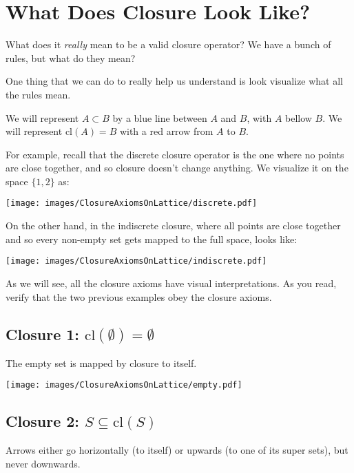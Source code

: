 \documentclass{report}
\newcommand{\cl}{\mathrm{cl}}
\begin{document}
\section{What Does Closure Look Like?}

What does it \emph{really} mean to be a valid closure operator? We have a bunch of rules, but what do they mean?

One thing that we can do to really help us understand is look visualize what all the rules mean.

We will represent $A \subset B$ by a blue line between $A$ and $B$, with $A$ bellow $B$. We will represent $\cl(A) = B$ with a red arrow from $A$ to $B$. 

For example, recall that the discrete closure operator is the one where no points are close together, and so closure doesn't change anything. We visualize it on the space $\{1,2\}$ as:

\begin{center}
\texttt{[image: images/ClosureAxiomsOnLattice/discrete.pdf]}
\end{center}

On the other hand, in the indiscrete closure, where all points are close together and so every non-empty set gets mapped to the full space, looks like:

\begin{center}
\texttt{[image: images/ClosureAxiomsOnLattice/indiscrete.pdf]}
\end{center}

As we will see, all the closure axioms have visual interpretations. As you read, verify that the two previous examples obey the closure axioms.

\subsection*{Closure 1: $\cl(∅) = ∅$}

The empty set is mapped by closure to itself.

\begin{center}
\texttt{[image: images/ClosureAxiomsOnLattice/empty.pdf]}
\end{center}

\subsection*{Closure 2: $S ⊆ \cl(S)$}

Arrows either go horizontally (to itself) or upwards (to one of its super sets), but never downwards.
\end{document}
